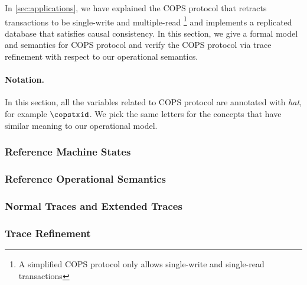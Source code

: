 In \cref{sec:applications}, we have explained the COPS protocol 
that retracts transactions to be single-write and multiple-read%
\footnote{A simplified COPS protocol only allows single-write and single-read transactions}
and implements a replicated database that satisfies causal consistency.
In this section, we give a formal model and semantics for COPS protocol
and verify the COPS protocol via trace refinement with respect to our operational semantics.

\paragraph{Notation.}
In this section, all the variables related to COPS protocol are annotated with \emph{hat}, 
for example \( \copstxid \).
We pick the same letters for the concepts that have similar meaning to our operational model.

\subsubsection{Reference Machine States} \label{sec:cops-model}  
\subsubsection{Reference Operational Semantics} \label{sec:cops-semantics}  
\subsubsection{Normal Traces and Extended Traces} \label{sec:cops-normal-trace}  
\label{sec:cops-extended-trace}  
\subsubsection{Trace Refinement} \label{sec:cops-encode}  
